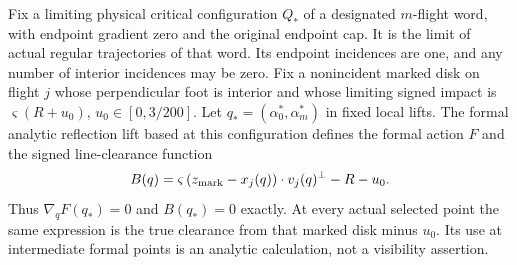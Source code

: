 Fix a limiting physical critical configuration $Q_*$ of a designated
$m$-flight word, with endpoint gradient zero and the original endpoint
cap.  It is the limit of actual regular trajectories of that word.
Its endpoint incidences are one, and any number of interior incidences
may be zero.  Fix a nonincident marked disk on flight $j$ whose
perpendicular foot is interior and whose limiting signed impact is
$\varsigma(R+u_0)$, $u_0\in[0,3/200]$.
Let $q_*=(\alpha_0^*,\alpha_m^*)$ in fixed local lifts.
The formal analytic reflection lift based at this configuration
defines the formal action $F$ and the signed line-clearance function
\begin{equation}\label{eq:zf-B}
 B(q)=\varsigma\,(z_{\rm mark}-x_j(q))\cdot v_j(q)^\perp-R-u_0.
\end{equation}
Thus $\nabla_qF(q_*)=0$ and $B(q_*)=0$ exactly.
At every actual selected point the same expression is the true
clearance from that marked disk minus $u_0$.  Its use at intermediate
formal points is an analytic calculation, not a visibility assertion.


